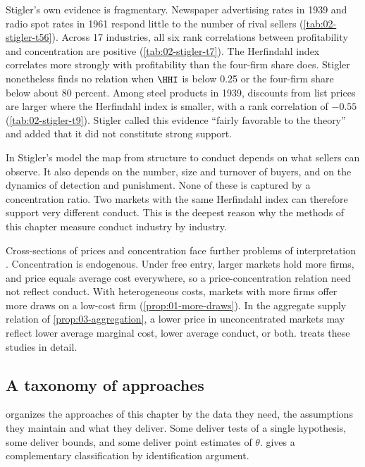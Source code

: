 Stigler's own evidence is fragmentary. Newspaper advertising rates in 1939 and radio spot rates in 1961 respond little to
the number of rival sellers (\cref{tab:02-stigler-t56}). Across 17 industries, all six rank correlations between
profitability and concentration are positive (\cref{tab:02-stigler-t7}). The Herfindahl index correlates more strongly
with profitability than the four-firm share does. Stigler nonetheless finds no relation when $\HHI$ is below 0.25 or the
four-firm share below about 80 percent. Among steel products in 1939, discounts from list prices are larger where the
Herfindahl index is smaller, with a rank correlation of $-0.55$ (\cref{tab:02-stigler-t9}). Stigler called this evidence
``fairly favorable to the theory'' and added that it did not constitute strong support.

In Stigler's model the map from structure to conduct depends on what sellers can observe. It also depends on the
number, size and turnover of buyers, and on the dynamics of detection and punishment. None of these is captured by
a concentration ratio. Two markets with the same Herfindahl index can therefore support very different conduct. This is
the deepest reason why the methods of this chapter measure conduct industry by industry.

Cross-sections of prices and concentration face further problems of interpretation \citep[pp.~1042--1044]{Bresnahan1989}.
Concentration is endogenous. Under free entry, larger markets hold more firms, and price equals average cost
everywhere, so a price-concentration relation need not reflect conduct. With heterogeneous costs, markets with more firms
offer more draws on a low-cost firm (\cref{prop:01-more-draws}). In the aggregate supply relation of
\cref{prop:03-aggregation}, a lower price in unconcentrated markets may reflect lower average marginal cost, lower average
conduct, or both.  treats these studies in detail.

\subsection{A taxonomy of approaches}\label{sec:03-taxonomy}

 organizes the approaches of this chapter by the data they need, the assumptions they maintain and
what they deliver. Some deliver tests of a single hypothesis, some deliver bounds, and some deliver point estimates of
$\theta$.  gives a complementary classification by identification argument.

